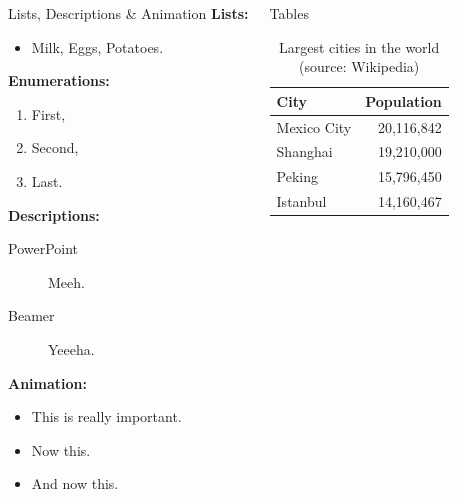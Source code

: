 \documentclass[final]{beamer}
\begin{document}
\begin{frame}[t,fragile]{}
\begin{center}
\begin{minipage}{0.9\paperwidth}
\begin{columns}[t,totalwidth=\textwidth]
          \begin{block}{Lists, Descriptions \& Animation}
            \textbf{Lists:}
            \begin{itemize}
              \item Milk, Eggs, Potatoes.
            \end{itemize}
            \textbf{Enumerations:}
            \begin{enumerate}
              \item First, \item Second, \item Last.
            \end{enumerate}
            \textbf{Descriptions:}
            \begin{description}
              \item[PowerPoint] Meeh.
              \item[Beamer] Yeeeha.
            \end{description}
            \textbf{Animation:}
            \begin{itemize}
              \item \alert{This is really important.}
              \item Now this.
              \item And now this.
            \end{itemize}
          \end{block}
          
          \vspace{0.5cm}
          
          \begin{block}{Tables}
            \begin{table}
              \caption{Largest cities in the world (source: Wikipedia)}
              \begin{tabular}{lr}
                \toprule
                City & Population\\
                \midrule
                Mexico City & 20,116,842\\
                Shanghai & 19,210,000\\
                Peking & 15,796,450\\
                Istanbul & 14,160,467\\
                \bottomrule
              \end{tabular}
            \end{table}
          \end{block}
        

\end{columns}
\end{minipage}
\end{center}
\end{frame}
\end{document}
